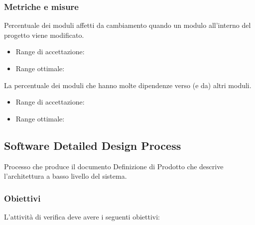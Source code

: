 \documentclass[a4paper,11pt]{article}
\begin{document}
\begin{itemize}
\subsubsection{Metriche e misure}
Percentuale dei moduli affetti da cambiamento quando un modulo all'interno del progetto viene modificato.
\begin{itemize}
	\item Range di accettazione: \begin{math}[\le 50\%]\end{math}
	\item Range ottimale: \begin{math}[\le 40\%]\end{math}
	\end{itemize}
La percentuale dei moduli che hanno molte dipendenze verso (e da) altri moduli.
\begin{itemize}
	\item Range di accettazione: \begin{math}[\le 30\%]\end{math}
	\item Range ottimale: \begin{math}[\le 25\%]\end{math}
	\end{itemize}
\subsection{Software Detailed Design Process}
Processo che produce il documento Definizione di Prodotto che descrive l'architettura a basso livello del sistema.
\subsubsection{Obiettivi}
L'attività di verifica deve avere i seguenti obiettivi:
\begin{itemize}


\end{itemize}
\end{itemize}
\end{document}
